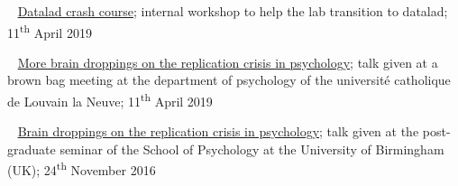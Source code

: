 




\textbullet~ \href{https://cpp-lln-lab.github.io/datalad_crash_course/}{Datalad crash course};
internal workshop to help the lab transition to datalad;
11\textsuperscript{th} April 2019

\textbullet~ \href{https://osf.io/vu327/}{More brain droppings on the replication crisis in psychology};
talk given at a brown bag meeting at the department of psychology of the université catholique de Louvain la Neuve;
11\textsuperscript{th} April 2019

\textbullet~ \href{https://dx.doi.org/10.6084/m9.figshare.4257992.v1}{Brain droppings on the replication crisis in psychology}; talk given at the post-graduate seminar of the School of Psychology at the University of Birmingham (UK);
24\textsuperscript{th} November 2016
